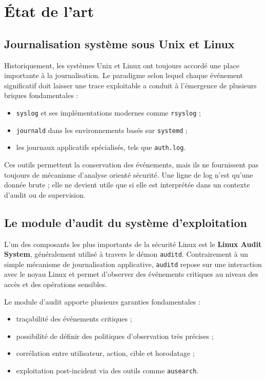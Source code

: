 \documentclass[12pt,a4paper]{article}
\begin{document}
\section{État de l’art}

\subsection{Journalisation système sous Unix et Linux}

Historiquement, les systèmes Unix et Linux ont toujours accordé une place importante à la journalisation. Le paradigme selon lequel chaque événement significatif doit laisser une trace exploitable a conduit à l’émergence de plusieurs briques fondamentales :
\begin{itemize}
    \item \texttt{syslog} et ses implémentations modernes comme \texttt{rsyslog} ;
    \item \texttt{journald} dans les environnements basés sur \texttt{systemd} ;
    \item les journaux applicatifs spécialisés, tels que \texttt{auth.log}.
\end{itemize}

Ces outils permettent la conservation des événements, mais ils ne fournissent pas toujours de mécanisme d’analyse orienté sécurité. Une ligne de log n’est qu’une donnée brute ; elle ne devient utile que si elle est interprétée dans un contexte d’audit ou de supervision.

\subsection{Le module d’audit du système d’exploitation}

L’un des composants les plus importants de la sécurité Linux est le \textbf{Linux Audit System}, généralement utilisé à travers le démon \texttt{auditd}. Contrairement à un simple mécanisme de journalisation applicative, \texttt{auditd} repose sur une interaction avec le noyau Linux et permet d’observer des événements critiques au niveau des accès et des opérations sensibles.

Le module d’audit apporte plusieurs garanties fondamentales :
\begin{itemize}
    \item traçabilité des événements critiques ;
    \item possibilité de définir des politiques d’observation très précises ;
    \item corrélation entre utilisateur, action, cible et horodatage ;
    \item exploitation post-incident via des outils comme \texttt{ausearch}.
\end{itemize}
\end{document}

